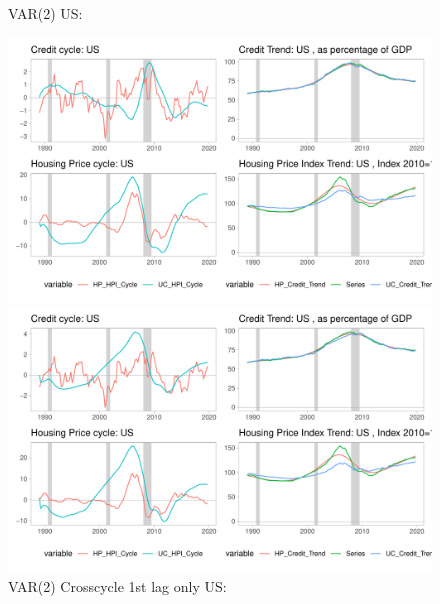 \documentclass[12pt]{article}
\begin{document}
\begin{outline}[enumerate]
		
		\begin{figure}[h!]
			\caption{VAR(2) US: }	
			\centerline{\includegraphics[scale=0.7]{../../Regression/VAR_2/Output/Graphs/HP_Credit_4graphs_US.pdf}}
%		
%		
%
			\caption{VAR(2) Crosscycle 1st lag only US: }	
			\centerline{\includegraphics[scale=0.7]{../../Regression/VAR_2_crosscycle_1stlagonly/Output/Graphs/HP_Credit_4graphs_US.pdf}}
		\end{figure}
		
		\clearpage
		

\end{outline}
\end{document}
